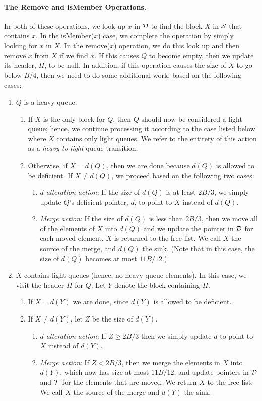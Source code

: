 \documentclass[11pt,letterpaper]{article}
\begin{document}
\paragraph{The Remove and isMember Operations.}
In both of these operations, we look up $x$ in $\cal D$ 
to find the block $X$ in $\cal S$ that
contains $x$.
In the isMember($x$) case, we complete the operation
by simply looking for $x$ in $X$.
In the
remove($x$) operation, we do this look up and then remove $x$ from $X$
if we find $x$.
If this causes $Q$ to become empty, then we update its header, $H$,
to be null.
In addition, if this operation causes the size of $X$ to go below $B/4$, then
we need to do some additional work, based on the following cases:
\begin{enumerate}
\item
$Q$ is a heavy queue.
\begin{enumerate}
\item
If $X$ is the only block for $Q$, then $Q$ should now be considered a light
queue; hence, we continue processing it according to the case listed
below where $X$ contains only light queues. We refer to the entirety of this action
as a \emph{heavy-to-light} queue transition.
\item
Otherwise, if $X=d(Q)$, then we are done because $d(Q)$ is allowed to be deficient. 
If $X \neq d(Q)$,
we proceed based on the following two cases:
\begin{enumerate}
\item \emph{$d$-alteration action:} If the size of $d(Q)$ is at least $2B/3$, we simply update $Q$'s deficient pointer, $d$, to point to $X$ instead of $d(Q)$.
\item \emph{Merge action}:
If the size of $d(Q)$ is less than $2B/3$, then we move all 
of the elements of $X$ into $d(Q)$ and we update 
the pointer in $\cal D$ for each moved element. $X$ is returned to the free list.
We call $X$ the source of the merge, and $d(Q)$ the sink.
(Note that in this case, the size of $d(Q)$ becomes at most $11B/12$.)
\end{enumerate}
\end{enumerate}
\item
$X$ contains light queues (hence, no heavy queue elements).  
In this case, we visit the header $H$ for $Q$. 
Let $Y$ denote the block containing $H$. 
\begin{enumerate} 
\item If $X=d(Y)$ we are done,
since $d(Y)$ is allowed to be deficient.
\item
If $X \neq d(Y)$, let $Z$ be the size of $d(Y)$. 
\begin{enumerate}
\item \emph{$d$-alteration action:} If $Z \geq 2B/3$ then we simply update $d$ to point to $X$ instead of $d(Y)$.
\item \emph{Merge action}:
If $Z < 2B/3$, then we merge the elements in $X$ into $d(Y)$, 
which now has size at most $11B/12$, and update pointers in
$\cal D$ and $\cal T$ for the elements that are moved. We return $X$ to the free list. We call 
$X$ the source of the merge and $d(Y)$ the sink.
\end{enumerate}
\end{enumerate}
\end{enumerate}
\end{document}
